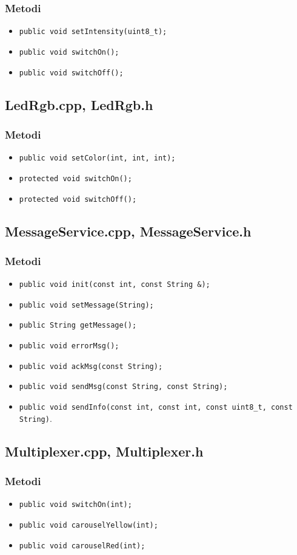 \subsubsection{Metodi}
\begin{itemize}
	\item \texttt{public void setIntensity(uint8\_t);}
	\item \texttt{public void switchOn();}
	\item \texttt{public void switchOff();}
\end{itemize}

\subsection{LedRgb.cpp, LedRgb.h}
\subsubsection{Metodi}
\begin{itemize}
	\item \texttt{public void setColor(int, int, int);}
	\item \texttt{protected	void switchOn();}
	\item \texttt{protected	void switchOff();}
\end{itemize}

\subsection{MessageService.cpp, MessageService.h}
\subsubsection{Metodi}
\begin{itemize}
	\item \texttt{public void init(const int, const String \&);}
	\item \texttt{public void setMessage(String);}
	\item \texttt{public String getMessage();}
	\item \texttt{public void errorMsg();}
	\item \texttt{public void ackMsg(const String);}
	\item \texttt{public void sendMsg(const String, const String);}
	\item \texttt{public void sendInfo(const int, const int, const uint8\_t, const String)}.
\end{itemize}

\subsection{Multiplexer.cpp, Multiplexer.h}
\subsubsection{Metodi}
\begin{itemize}
	\item \texttt{public void switchOn(int);}
	\item \texttt{public void carouselYellow(int);}
	\item \texttt{public void carouselRed(int);}
\end{itemize}

